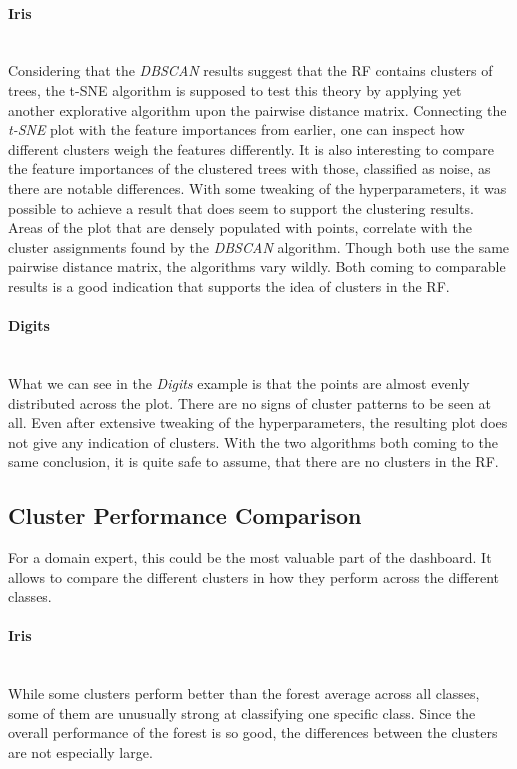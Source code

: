 \documentclass[a4paper, 12pt]{article}
\begin{document}
\paragraph{Iris}\mbox{}\\
Considering that the \textit{DBSCAN} results suggest that the RF contains clusters of trees, the t-SNE algorithm
is supposed to test this theory by applying yet another explorative algorithm upon the pairwise distance matrix.
Connecting the \textit{t-SNE} plot with the feature importances from earlier, one can inspect how different
clusters weigh the features differently. It is also interesting to compare the feature importances of the
clustered trees with those, classified as noise, as there are notable differences.
With some tweaking of the hyperparameters, it was possible to achieve a result that does seem to support the
clustering results. Areas of the plot that are densely populated with points, correlate with the cluster
assignments found by the \textit{DBSCAN} algorithm. Though both use the same pairwise distance matrix, the
algorithms vary wildly. Both coming to comparable results is a good indication that supports the idea of clusters
in the RF. \par

\paragraph{Digits}\mbox{}\\
What we can see in the \textit{Digits} example is that the points are almost evenly distributed across the plot.
There are no signs of cluster patterns to be seen at all. Even after extensive tweaking of the hyperparameters,
the resulting plot does not give any indication of clusters. With the two algorithms both coming to the same
conclusion, it is quite safe to assume, that there are no clusters in the RF.

\subsection{Cluster Performance Comparison}
For a domain expert, this could be the most valuable part of the dashboard. It allows to compare the different
clusters in how they perform across the different classes.

\paragraph{Iris}\mbox{}\\
While some clusters perform better than the forest average across all classes, some of them are unusually
strong at classifying one specific class. Since the overall performance of the forest is so good, the
differences between the clusters are not especially large. \par
\end{document}
